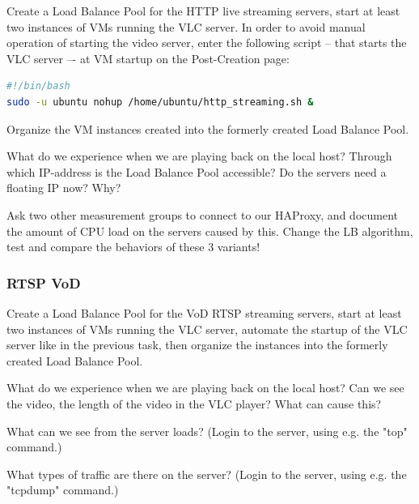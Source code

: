 \documentclass[a4paper]{article}
\begin{document}
Create a Load Balance Pool for the HTTP live streaming servers, start at least two instances of VMs running the VLC server. In order to avoid manual operation of starting the video server, enter the following script -- that starts the VLC server –- at VM startup on the Post-Creation page:
\begin{lstlisting}[language=bash,breaklines]
#!/bin/bash
sudo -u ubuntu nohup /home/ubuntu/http_streaming.sh &
\end{lstlisting}

Organize the VM instances created into the formerly created Load Balance Pool. 

\noindent{}What do we experience when we are playing back on the local host? Through which IP-address is the Load Balance Pool accessible? Do the servers need a floating IP now? Why?

\noindent{}Ask two other measurement groups to connect to our HAProxy, and document the amount of CPU load on the servers caused by this.
Change the LB algorithm, test and compare the behaviors of these 3 variants!

\subsubsection{RTSP VoD}

Create a Load Balance Pool for the VoD RTSP streaming servers, start at least two instances of VMs running the VLC server, automate the startup of the VLC server like in the previous task, then organize the instances into the formerly created Load Balance Pool.

\noindent{}What do we experience when we are playing back on the local host? Can we see the video, the length of the video in the VLC player? What can cause this?

\noindent{}What can we see from the server loads? (Login to the server, using e.g. the "top" command.)

\noindent{}What types of traffic are there on the server? (Login to the server, using e.g. the "tcpdump" command.)
\end{document}
